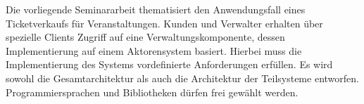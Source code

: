 Die vorliegende Seminararbeit thematisiert den Anwendungsfall eines Ticketverkaufs für Veranstaltungen.
Kunden und Verwalter erhalten über spezielle Clients Zugriff auf eine Verwaltungskomponente, dessen Implementierung auf einem Aktorensystem basiert.
Hierbei muss die Implementierung des Systems vordefinierte Anforderungen erfüllen.
Es wird sowohl die Gesamtarchitektur als auch die Architektur der Teilsysteme entworfen.
Programmiersprachen und Bibliotheken dürfen frei gewählt werden.

